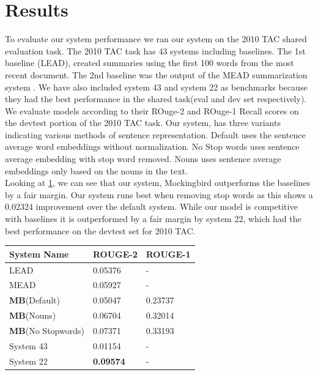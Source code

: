 \documentclass[11pt,a4paper]{article}
\begin{document}
\section{Results}
To evaluate our system performance we ran our system on the 2010 TAC shared evaluation task. The 2010 TAC task has 43 systems including baselines. The 1st baseline (LEAD), created summaries using the first 100 words from the most recent document. The 2nd baseline was the output of the MEAD summarization system \cite{Radev2003MEADRM}. We have also included system 43 and system 22 as benchmarks because they had the best performance in the shared task(eval and dev set respectively). We evaluate models according to their ROuge-2 and ROuge-1 Recall scores on the devtest portion of the 2010 TAC task. Our system, has three variants indicating various methods of sentence representation. Default uses the sentence average word embeddings without normalization. No Stop words uses sentence average embedding with stop word removed. Nouns uses sentence average embeddings only based on the nouns in the text. \\
Looking at \ref{table:1}, we can see that our system, Mockingbird outperforms the baselines by a fair margin. Our system runs best when removing stop words as this shows a 0.02324 improvement over the default system. While our model is competitive with baselines it is outperformed by a fair margin by system 22, which had the best performance on the devtest set for 2010 TAC. 
\begin{table}[h]
\begin{tabular}{|l|l|l|} \hline
\textbf{System Name} & \textbf{ROUGE-2} & \textbf{ROUGE-1}\\ \hline
LEAD & 0.05376 & - \\ \hline
MEAD & 0.05927 &  -\\ \hline
\textbf{MB}(Default) &  0.05047 & 0.23737 \\ \hline
\textbf{MB}(Nouns) & 0.06704  &  0.32014\\ \hline
\textbf{MB}(No Stopwords) & 0.07371 & 0.33193 \\ \hline
System 43 & 0.01154 & -\\ \hline
System 22 & \textbf{0.09574} & - \\ \hline
\end{tabular}
\label{table:1}
\end{table}
\end{document}
